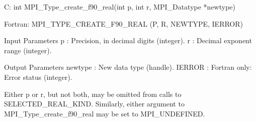 C:
int MPI_Type_create_f90_real(int p, int r, MPI_Datatype *newtype)

Fortran:
MPI_TYPE_CREATE_F90_REAL (P, R, NEWTYPE, IERROR)

Input Parameters
p : Precision, in decimal digits (integer).
r : Decimal exponent range (integer).

Output Parameters
newtype : New data type (handle).
IERROR : Fortran only: Error status (integer).

Either p or r, but not both, may be omitted from calls to
SELECTED_REAL_KIND. Similarly, either argument to
MPI_Type_create_f90_real may be set to MPI_UNDEFINED.
